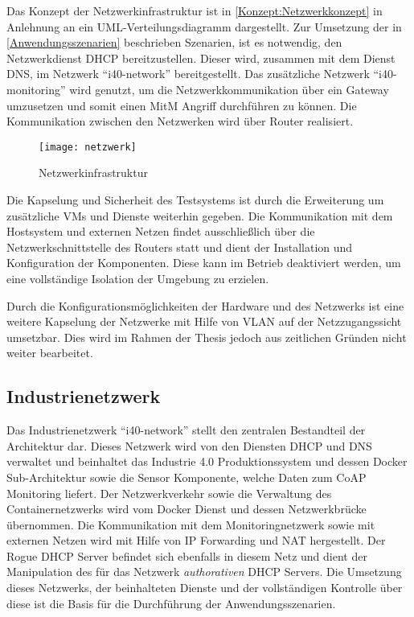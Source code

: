 Das Konzept der Netzwerkinfrastruktur ist in \autoref{Konzept:Netzwerkkonzept} in Anlehnung an ein \ac{UML}-Verteilungsdiagramm dargestellt. Zur Umsetzung der in \autoref{Anwendungsszenarien} beschrieben Szenarien, ist es notwendig, den Netzwerkdienst \ac{DHCP} bereitzustellen. Dieser wird, zusammen mit dem Dienst \ac{DNS}, im Netzwerk "`i40-network"' bereitgestellt. Das zusätzliche Netzwerk "`i40-monitoring"' wird genutzt, um die Netzwerkkommunikation über ein Gateway umzusetzen und somit einen \ac{MitM} Angriff durchführen zu können. Die Kommunikation zwischen den Netzwerken wird über Router realisiert.

\begin{figure}[h]
  \centering
  \texttt{[image: netzwerk]}
  \caption{Netzwerkinfrastruktur} 
  \label{Konzept:Netzwerkkonzept}
\end{figure}

Die Kapselung und Sicherheit des Testsystems ist durch die Erweiterung um zusätzliche \ac{VM}s und Dienste weiterhin gegeben. Die Kommunikation mit dem Hostsystem und externen Netzen findet ausschließlich über die Netzwerkschnittstelle des Routers statt und dient der Installation und Konfiguration der Komponenten. Diese kann im Betrieb deaktiviert werden, um eine vollständige Isolation der Umgebung zu erzielen.

Durch die Konfigurationsmöglichkeiten der Hardware und des Netzwerks ist eine weitere Kapselung der Netzwerke mit Hilfe von \ac{VLAN} auf der Netzzugangssicht umsetzbar. Dies wird im Rahmen der Thesis jedoch aus zeitlichen Gründen nicht weiter bearbeitet.

\subsection{Industrienetzwerk}
Das Industrienetzwerk "`i40-network"' stellt den zentralen Bestandteil der Architektur dar. Dieses Netzwerk wird von den Diensten \ac{DHCP} und \ac{DNS} verwaltet und beinhaltet das Industrie 4.0 Produktionssystem und dessen Docker Sub-Architektur sowie die Sensor Komponente, welche Daten zum \ac{CoAP} Monitoring liefert. Der Netzwerkverkehr sowie die Verwaltung des Containernetzwerks wird vom Docker Dienst und dessen Netzwerkbrücke übernommen. Die Kommunikation mit dem Monitoringnetzwerk sowie mit externen Netzen wird mit Hilfe von \ac{IP} Forwarding und \ac{NAT} hergestellt. Der Rogue \ac{DHCP} Server befindet sich ebenfalls in diesem Netz und dient der Manipulation des für das Netzwerk \textit{authorativen} \ac{DHCP} Servers. Die Umsetzung dieses Netzwerks, der beinhalteten Dienste und der vollständigen Kontrolle über diese ist die Basis für die Durchführung der Anwendungsszenarien.

